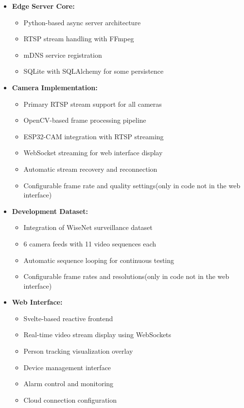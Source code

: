 \documentclass[conference]{IEEEtran}
\begin{document}
\begin{itemize}
      \item \textbf{Edge Server Core:} 
            \begin{itemize}
                  \item Python-based async server architecture
                  \item RTSP stream handling with FFmpeg
                  \item mDNS service registration
                  \item SQLite with SQLAlchemy for some persistence
            \end{itemize}
      \item \textbf{Camera Implementation:} 
            \begin{itemize}
                  \item Primary RTSP stream support for all cameras
                  \item OpenCV-based frame processing pipeline
                  \item ESP32-CAM integration with RTSP streaming
                  \item WebSocket streaming for web interface display
                  \item Automatic stream recovery and reconnection
                  \item Configurable frame rate and quality settings(only in code not in the web interface)
            \end{itemize}
      \item \textbf{Development Dataset:} 
            \begin{itemize}
                  \item Integration of WiseNet surveillance dataset
                  \item 6 camera feeds with 11 video sequences each
                  \item Automatic sequence looping for continuous testing
                  \item Configurable frame rates and resolutions(only in code not in the web interface)
            \end{itemize}
      \item \textbf{Web Interface:} 
            \begin{itemize}
                  \item Svelte-based reactive frontend
                  \item Real-time video stream display using WebSockets
                  \item Person tracking visualization overlay
                  \item Device management interface
                  \item Alarm control and monitoring
                  \item Cloud connection configuration
            \end{itemize}
\end{itemize}
\end{document}

